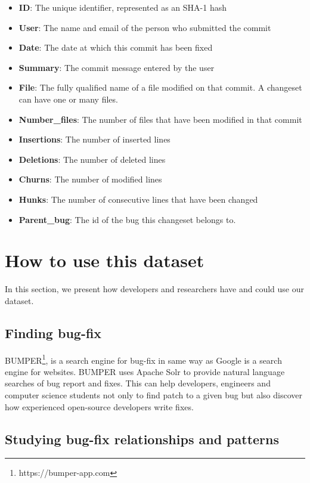 \documentclass{sig-alternate-05-2015}
\begin{document}
\begin{itemize}

  \item 	\textbf{ID}: The unique identifier, represented as an SHA-1
  hash
  \item 	\textbf{User}: The name and email of the person who
  submitted the commit
  \item 	\textbf{Date}: The date at which this commit has been fixed
  \item 	\textbf{Summary}: The commit message entered by the user
  \item 	\textbf{File}: The fully qualified name of a file modified on
  that commit. A changeset can have one or many files.
  \item 	\textbf{Number\_files}: The number of files that have been
  modified in that commit
  \item 	\textbf{Insertions}: The number of inserted lines
  \item 	\textbf{Deletions}: The number of deleted lines
  \item 	\textbf{Churns}: The number of modified lines
  \item 	\textbf{Hunks}: The number of consecutive lines that have
  been changed
  \item 	\textbf{Parent\_bug}: The id of the bug this changeset belongs
  to.
\end{itemize}


\section{How to use this dataset}

In this section, we present how developers and researchers have and could use our dataset.

\subsection{Finding bug-fix}
\label{subs:Bug Fixing}

BUMPER\cite{Nayrolles2015d,Nayrolles2016}\footnote{https://bumper-app.com}, is a search engine for bug-fix in same way as Google is a search engine for websites. BUMPER uses Apache Solr\cite{Nayrolles2014b} to provide natural language searches of bug report and fixes.
This can help developers, engineers and computer science students not only to find patch to a given bug but also discover how experienced open-source developers write fixes.

\subsection{Studying bug-fix relationships and patterns}
\label{subs:Studying bug-fix relationships}
\end{document}
